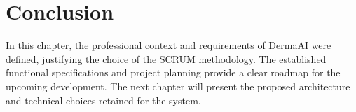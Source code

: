 	
	
	\section{Conclusion}
	
	In this chapter, the professional context and requirements of DermaAI were defined, justifying the choice of the SCRUM methodology. The established functional specifications and project planning provide a clear roadmap for the upcoming development. The next chapter will present the proposed architecture and technical choices retained for the system.
